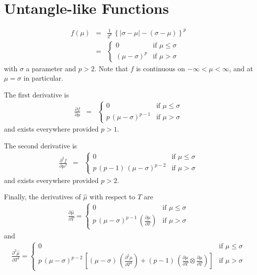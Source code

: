 \documentclass{report}
\begin{document}
\section{Untangle-like Functions}

\begin{eqnarray}
f(\mu) & = & \frac{1}{2^p} \, \left\{ |\sigma - \mu | - (\sigma - \mu) \right\}^p \\
 & = & \left\{ \begin{array}{cc} 
0 & \mbox{if $\mu \leq \sigma$} \\
(\mu-\sigma)^p & \mbox{if $\mu > \sigma$}
\end{array} \right.
\end{eqnarray}
with $\sigma$ a parameter and $p > 2$. Note that $f$ is continuous on 
$-\infty < \mu < \infty$, and at $\mu = \sigma$ in particular. \newline

\noindent The first derivative is
\begin{eqnarray}
\frac{\partial f}{\partial \mu}  & = & \left\{ \begin{array}{cc} 
0 & \mbox{if $\mu \leq \sigma$} \\
p \, (\mu-\sigma)^{p-1} & \mbox{if $\mu > \sigma$}
\end{array} \right.
\end{eqnarray}
and exists everywhere provided $p>1$. \newline

\noindent The second derivative is 
\begin{eqnarray}
\frac{\partial^2 f}{\partial \mu^2}  & = & \left\{ \begin{array}{cc} 
0 & \mbox{if $\mu \leq \sigma$} \\
p \, (p-1) \, (\mu-\sigma)^{p-2} & \mbox{if $\mu > \sigma$}
\end{array} \right.
\end{eqnarray}
and exists everywhere provided $p>2$. \newline

\noindent Finally, the derivatives of $\hat{\mu}$ with respect to $T$ are
\begin{eqnarray}
\frac{\partial \hat{\mu}}{\partial T} = \left\{ \begin{array}{cc} 
0 & \mbox{if $\mu \leq \sigma$} \\
p \, (\mu-\sigma)^{p-1} \, \left( \frac{\partial \mu}{\partial T} \right) & \mbox{if $\mu > \sigma$}
\end{array} \right.
\end{eqnarray}
and 
\begin{eqnarray}
\frac{\partial^2 \hat{\mu}}{\partial T^2} = \left\{ \begin{array}{cc} 
0 & \mbox{if $\mu \leq \sigma$} \\
p \, (\mu-\sigma)^{p-2} \, \left[ (\mu-\sigma) \, \left( \frac{\partial^2 \mu}{\partial T^2} \right) + (p-1) \, \left( \frac{\partial \mu}{\partial T} \otimes \frac{\partial \mu}{\partial T} \right) \right] & \mbox{if $\mu > \sigma$}
\end{array} \right.
\end{eqnarray}
\end{document}
